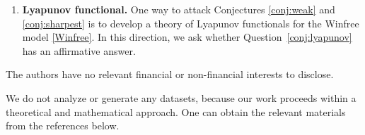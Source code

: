 \documentclass[11pt,reqno]{amsart}
\theoremstyle{definition}
\theoremstyle{remark}
\begin{document}
\begin{enumerate}
This paper proves that synchronization occurs in the low inertia regime; proving or disproving synchronization in the high inertia regime would require genuinely new tools.
 A sharp pathwise theorem, i.e., one that matches
numerical experiments, such as that of Conjecture \ref{conj:sharpest}, remains to be proved. 


\item \textbf{Lyapunov functional.} One way to attack Conjectures \ref{conj:weak} and \ref{conj:sharpest} is to develop a theory of Lyapunov functionals for the Winfree model \eqref{Winfree}. In this direction, we ask whether Question~\ref{conj:lyapunov} has an affirmative answer.
\end{enumerate}

\bigskip
{} The authors have no relevant financial or non-financial interests to disclose.

\bigskip
{} We do not analyze or generate any datasets, because our work proceeds within a theoretical and mathematical approach. One can obtain the relevant materials from the references below.



\end{document}

